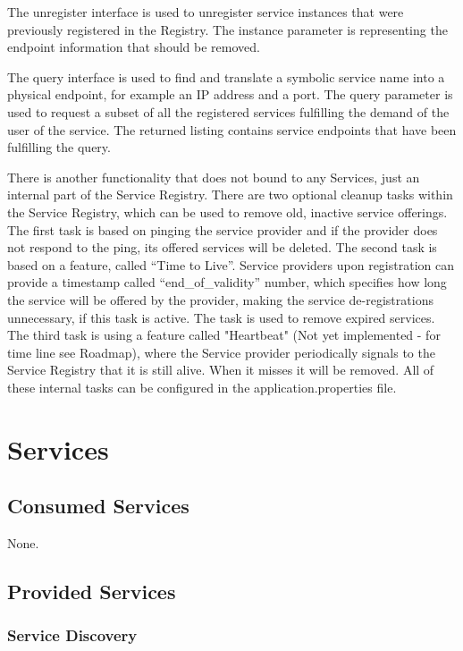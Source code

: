 \documentclass[a4paper]{arrowhead}
\newcommand{\spdef}[2]{{\textcolor{ArrowheadBlue}{#2\label{sec:services:produced:#1}}}}
\begin{document}
The unregister interface is used to unregister service instances that were previously registered in the Registry. The instance parameter is representing the endpoint information that should be removed.

The query interface is used to find and translate a symbolic service name into a physical endpoint, for example an IP address and a port. The query parameter is used to request a subset of all the registered services fulfilling the demand of the user of the service. The returned listing contains service endpoints that have been fulfilling the query.

There is another functionality that does not bound to any Services,
just an internal part of the Service Registry. There are two optional
cleanup tasks within the Service Registry, which can be used to remove
old, inactive service offerings. The first task is based on pinging
the service provider and if the provider does not respond to the ping,
its offered services will be deleted. The second task is based on a
feature, called “Time to Live”. Service providers upon registration
can provide a timestamp called “end\_of\_validity” number, which
specifies how long the service will be offered by the provider, making
the service de-registrations unnecessary, if this task is active. The
task is used to remove expired services. The third task is using a
feature called "Heartbeat" (Not yet implemented - for time line see Roadmap), where the Service provider periodically signals to the Service Registry that it is still alive. When it misses it will be removed. All of these internal tasks can be configured in the application.properties file.

\section{Services}
\label{sec:services}


\subsection{Consumed Services}

None.

\subsection{Provided Services}

\subsubsection{\spdef{ServiceDiscovery}{Service Discovery}}
\end{document}
